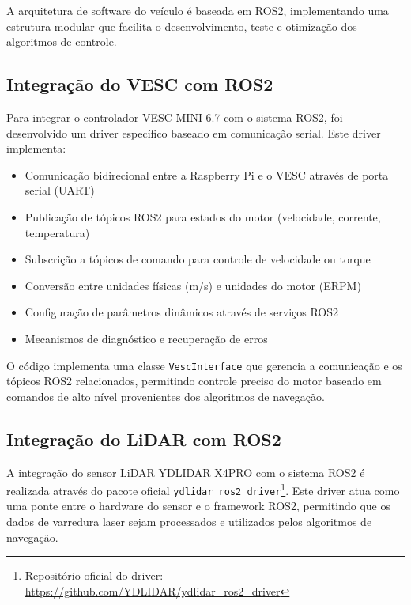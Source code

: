 A arquitetura de software do veículo é baseada em ROS2, implementando uma
estrutura modular que facilita o desenvolvimento, teste e otimização dos
algoritmos de controle.

\subsection{Integração do VESC com ROS2}

Para integrar o controlador VESC MINI 6.7 com o sistema ROS2, foi desenvolvido
um driver específico baseado em comunicação serial. Este driver implementa:

\begin{itemize}
      \item Comunicação bidirecional entre a Raspberry Pi e o VESC através de porta serial
            (UART)
      \item Publicação de tópicos ROS2 para estados do motor (velocidade, corrente,
            temperatura)
      \item Subscrição a tópicos de comando para controle de velocidade ou torque
      \item Conversão entre unidades físicas (m/s) e unidades do motor (ERPM)
      \item Configuração de parâmetros dinâmicos através de serviços ROS2
      \item Mecanismos de diagnóstico e recuperação de erros
\end{itemize}

O código implementa uma classe \texttt{VescInterface} que gerencia a
comunicação e os tópicos ROS2 relacionados, permitindo controle preciso do
motor baseado em comandos de alto nível provenientes dos algoritmos de
navegação.

\subsection{Integração do LiDAR com ROS2}

A integração do sensor LiDAR YDLIDAR X4PRO com o sistema ROS2 é realizada
através do pacote oficial \texttt{ydlidar\_ros2\_driver}\footnote{Repositório
      oficial do driver: \url{https://github.com/YDLIDAR/ydlidar_ros2_driver}}. Este
driver atua como uma ponte entre o hardware do sensor e o framework ROS2,
permitindo que os dados de varredura laser sejam processados e utilizados pelos
algoritmos de navegação.

